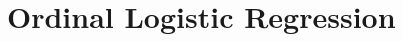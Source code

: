 \documentclass{beamer}
\begin{document}
\section{Ordinal Logistic Regression}









%
\end{document}
